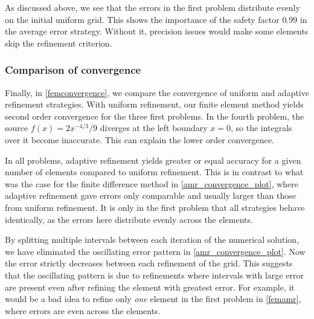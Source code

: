 As discussed above, we see that the errors in the first problem distribute evenly on the initial uniform grid.
This shows the importance of the safety factor $0.99$ in the average error strategy.
Without it, precision issues would make some elements skip the refinement criterion.

\subsubsection{Comparison of convergence}

Finally, in \cref{femconvergence}, we compare the convergence of uniform and adaptive refinement strategies.
With uniform refinement, our finite element method yields second order convergence for the three first problems.
In the fourth problem, the source $f(x) = 2x^{-4/3}/9$ diverges at the left boundary $x = 0$, so the integrals over it become inaccurate.
This can explain the lower order convergence.

In all problems, adaptive refinement yields greater or equal accuracy for a given number of elements compared to uniform refinement.
This is in contrast to what was the case for the finite difference method in \cref{amr_convergence_plot}, where adaptive refinement gave errors only comparable and usually larger than those from uniform refinement.
It is only in the first problem that all strategies behave identically, as the errors here distribute evenly across the elements.

By splitting multiple intervals between each iteration of the numerical solution, we have eliminated the oscillating error pattern in \cref{amr_convergence_plot}.
Now the error strictly decreases between each refinement of the grid.
This suggests that the oscillating pattern is due to refinements where intervals with large error are present even after refining the element with greatest error.
For example, it would be a bad idea to refine only \emph{one} element in the first problem in \cref{femamr}, where errors are even across the elements.


